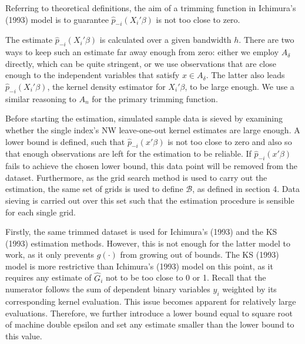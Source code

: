 Referring to theoretical definitions, the aim of a trimming function in Ichimura's (1993) \cite{[6]} model is to guarantee $\hat{p}_{-i}(X_i'\beta)$ is not too close to zero. 

The estimate $\hat{p}_{-i}(X_i'\beta)$ is calculated over a given bandwidth $h$. There are two ways to keep such an estimate far away enough from zero: either we  employ $A_\delta$  directly, which can be quite stringent, or we use observations that are close enough to the independent variables that satisfy $x \in A_\delta$. The latter also leads $\hat{p}_{-i}(X_i'\beta)$, the kernel density estimator for $X_i'\beta$, to be large enough. We use a similar reasoning to $A_n$ for the primary trimming function.

Before starting the estimation, simulated sample data is sieved by examining whether the single index's NW leave-one-out kernel estimates are large enough. A lower bound is defined, such that $\hat{p}_{-i}(x'\beta)$ is not too close to zero and also so that enough observations are left  for the estimation to be reliable. If $\hat{p}_{-i}(x'\beta)$ fails to achieve the chosen lower bound, this data point will be removed from the dataset.
Furthermore, as the grid search method is used to carry out the estimation, the same set of grids is used to define $\mathcal{B}$, as defined in section 4. Data sieving is carried out over this set such that the estimation procedure is sensible for each single grid.

Firstly, the same trimmed dataset is used for Ichimura's (1993) \cite{[6]} and the KS (1993) \cite{[12]} estimation methods. However, this is not enough for the latter model to work, as it only prevents $g(\cdot)$ from growing out of bounds.  The KS (1993) \cite{[12]} model is more restrictive than Ichimura's (1993) \cite{[6]} model on this point, as it requires any estimate of $\hat{G}_i$ not to be too close to 0 or 1. Recall that the numerator follows the sum of dependent binary variables $y_i$ weighted by its corresponding kernel evaluation. This issue becomes apparent for relatively large evaluations. Therefore, we further introduce a lower bound equal to square root of machine double epsilon and set any estimate smaller than the lower bound to this value.


